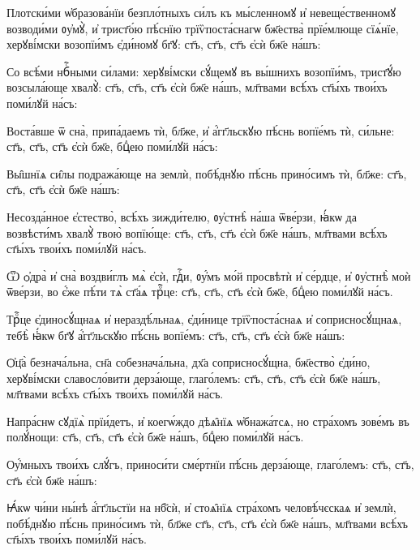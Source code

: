 
\hKv Плотски́ми ѡ҆бразова́нїи безпло́тныхъ си́лъ къ мы́сленномꙋ  и҆ невеще́ственномꙋ возводи́ми ᲂу҆мꙋ̀, и҆ трист҃о́ю  пѣ́снїю трїѷпоста́снагѡ бж҃ества̀ прїе́млюще сїѧ́нїе,  херꙋві́мски возопїи́мъ є҆ди́номꙋ бг҃ꙋ: ст҃ъ, ст҃ъ, ст҃ъ  є҆сѝ бж҃е на́шъ:  
%

\hKv Со всѣ́ми нбⷭ҇ными си́лами: херꙋві́мски сꙋ́щемꙋ въ  вы́шнихъ возопїи́мъ, трист҃ꙋ́ю возсыла́юще хвалꙋ̀:  ст҃ъ,  ст҃ъ, ст҃ъ є҆сѝ бж҃е на́шъ, мл҃твами всѣ́хъ ст҃ы́хъ  твои́хъ поми́лꙋй на́съ: 
%

\hKv Воста́вше ѿ сна̀, припа́даемъ тѝ, бл҃же, и҆  а҆́гг҃льскꙋю пѣ́снь вопїе́мъ тѝ, си́льне: ст҃ъ, ст҃ъ, ст҃ъ  є҆сѝ бж҃е, бцⷣею поми́лꙋй на́съ: 
%

\hKv Вы̑шнїѧ си̑лы подража́юще на землѝ, побѣ́днꙋю пѣ́снь  прино́симъ тѝ, бл҃же: ст҃ъ, ст҃ъ, ст҃ъ є҆сѝ бж҃е на́шъ: 
%

\hKv Несозда́нное є҆стество̀, всѣ́хъ зижди́телю,  ᲂу҆стнѣ̀ на́ша ѿве́рзи, ꙗ҆́кѡ да возвѣсти́мъ хвалꙋ̀  твою̀ вопїю́ще: ст҃ъ, ст҃ъ, ст҃ъ є҆сѝ бж҃е на́шъ, мл҃твами  всѣ́хъ ст҃ы́хъ твои́хъ поми́лꙋй на́съ. 
%

\hKv Ѿ ѻ҆дра̀ и҆ сна̀ воздви́глъ мѧ̀ є҆сѝ, гдⷭ҇и,  ᲂу҆́мъ мо́й просвѣтѝ и҆ се́рдце, и҆  ᲂу҆стнѣ̀ моѝ ѿве́рзи, во є҆́же пѣ́ти тѧ̀ ст҃а́ѧ  трⷪ҇це: ст҃ъ, ст҃ъ, ст҃ъ є҆сѝ бж҃е, бцⷣею поми́лꙋй на́съ. 
%

\hKv Трⷪ҇це є҆диносꙋ́щнаѧ и҆ нераздѣ́льнаѧ, є҆ди́нице  трїѷпоста́снаѧ и҆ соприсносꙋ́щнаѧ, тебѣ̀ ꙗ҆́кѡ бг҃ꙋ  а҆́гг҃льскꙋю пѣ́снь вопїе́мъ: ст҃ъ, ст҃ъ, ст҃ъ є҆сѝ бж҃е  на́шъ: 
%

\hKv Ѻ҆ц҃а̀ безнача́льна, сн҃а собезнача́льна, дх҃а  соприсносꙋ́щна, бж҃ество̀ є҆ди́но, херꙋві́мски  славосло́вити дерза́юще, глаго́лемъ: ст҃ъ, ст҃ъ, ст҃ъ є҆сѝ  бж҃е на́шъ, мл҃твами всѣ́хъ ст҃ы́хъ твои́хъ поми́лꙋй на́съ. 
%

\hKv Напра́снѡ сꙋдїѧ̀ прїи́детъ, и҆ коегѡ́ждо дѣѧ̑нїѧ  ѡ҆бнажа́тсѧ, но стра́хомъ зове́мъ въ полꙋ́нощи: ст҃ъ, ст҃ъ,  ст҃ъ є҆сѝ бж҃е на́шъ, бцⷣею поми́лꙋй на́съ. 
%

\hKv Оу҆́мныхъ твои́хъ слꙋ́гъ, приноси́ти сме́ртнїи пѣ́снь  дерза́юще, глаго́лемъ: ст҃ъ, ст҃ъ, ст҃ъ є҆сѝ бж҃е на́шъ:   
%

\hKv Ꙗ҆́кѡ чи́ни ны́нѣ а҆́гг҃льстїи на нб҃сѝ, и҆  стоѧ̑нїѧ стра́хомъ человѣ́чєскаѧ и҆ землѝ, побѣ́днꙋю  пѣ́снь прино́симъ тѝ, бл҃же ст҃ъ, ст҃ъ, ст҃ъ є҆сѝ бж҃е  на́шъ, мл҃твами всѣ́хъ ст҃ы́хъ твои́хъ поми́лꙋй на́съ. 
%

